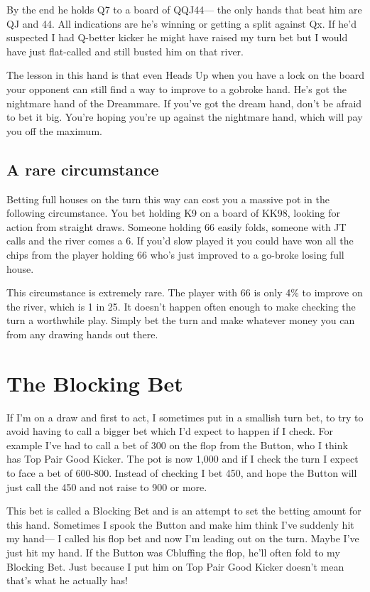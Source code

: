 By the end he holds Q7 to a board of QQJ44--- the only hands that beat
him are QJ and 44. All indications are he's winning or getting a split
against Qx. If he'd suspected I had Q-better kicker he might have
raised my turn bet but I would have just flat-called and still busted
him on that river.

The lesson in this hand is that even Heads Up when you have a lock on
the board your opponent can still find a way to improve to a gobroke
hand. He's got the nightmare hand of the Dreammare.
If you've got the dream hand, don't be afraid to bet it big. You're
hoping you're up against the nightmare hand, which will pay you off
the maximum.

\subsection*{A rare circumstance}

Betting full houses on the turn this way can cost you a massive pot in
the following circumstance. You bet holding K9 on a board
of KK98, looking for action from straight draws. Someone
holding 66 easily folds, someone with JT calls and the river comes
a 6. If you'd slow played it you could have won all the chips from
the player holding 66 who's just improved to a go-broke losing full
house.

This circumstance is extremely rare. The player with 66 is only 4\% to
improve on the river, which is 1 in 25. It doesn't happen often enough
to make checking the turn a worthwhile play. Simply bet
the turn and make whatever money you can from any drawing hands
out there.

\section{The Blocking Bet}

If I'm on a draw and first to act, I sometimes put in a smallish
turn bet, to try to avoid having to call a bigger bet which
I'd expect to happen if I check. For example I've had to call a bet
of 300 on the flop from the Button, who I think has Top Pair
Good Kicker. The pot is now 1,000 and if I check the turn I expect to
face a bet of 600-800. Instead of checking I bet 450, and hope the Button
will just call the 450 and not raise to 900 or more.

This bet is called a Blocking Bet and is an attempt to set the betting
amount for this hand. Sometimes I spook the Button and make him think I've
suddenly hit my hand--- I called his flop bet and now I'm leading out
on the turn. Maybe I've just hit my hand. If the Button was Cbluffing
the flop, he'll often fold to my Blocking Bet. Just because I put him
on Top Pair Good Kicker doesn't mean that's what he actually has!

